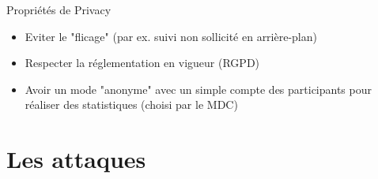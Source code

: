 \documentclass[aspectratio=169]{beamer}
\begin{document}
\begin{frame}{Propriétés de Privacy}
    \begin{itemize}
        \item Eviter le "flicage" (par ex. suivi non sollicité en arrière-plan)\pause
        \item Respecter la réglementation en vigueur (RGPD)\pause
        \item Avoir un mode "anonyme" avec un simple compte des participants pour réaliser des statistiques (choisi par le MDC)
    \end{itemize}
\end{frame}

\section{Les attaques}
\end{document}
